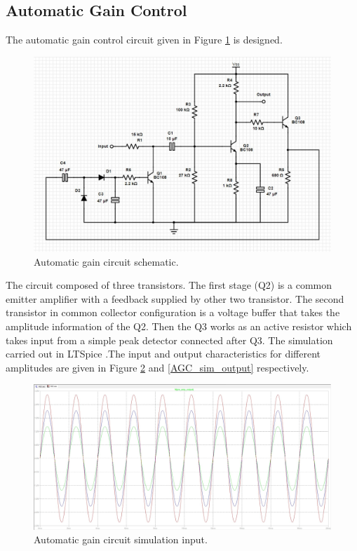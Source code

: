\documentclass[a4paper,10pt]{IEEEtran}
\begin{document}
\subsection{Automatic Gain Control}
The automatic gain control circuit given in Figure \ref{AGC} is designed.

\begin{figure}[htbp!]
    \centering
    \includegraphics[width = 1\linewidth]{AGC Circuit.jpg}
    \caption{Automatic gain circuit schematic.}
    \label{AGC}
\end{figure} 
 The circuit composed of three transistors. The first stage (Q2) is a common emitter amplifier with a feedback supplied by other two transistor. The second transistor in common collector configuration is a voltage buffer that takes the amplitude information of the Q2. Then the Q3 works as an active resistor which takes input from a simple peak detector connected after Q3. 
 The simulation carried out in LTSpice .The  input and output characteristics for different amplitudes are given in Figure \ref{AGC_sim_input} and \ref{AGC_sim_output} respectively.
 \begin{figure}[htbp!]
    \centering
    \includegraphics[width = 1\linewidth]{AGC Simulation Input.jpg}
    \caption{Automatic gain circuit simulation input.}
    \label{AGC_sim_input}
\end{figure} 
\end{document}
